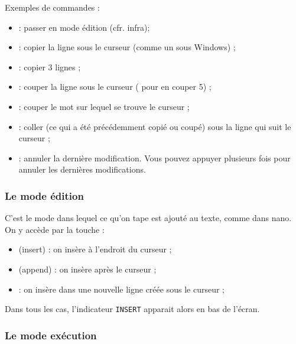\documentclass[a4paper,11pt]{style-esi/td}
\begin{document}
			Exemples de commandes :
			\begin{itemize}
			\item {} : passer en mode édition (cfr. infra);
			\item {} : copier la ligne sous le curseur (comme un  sous Windows) ; 
			\item {}	: copier 3 lignes ;
			\item {} : couper la ligne sous le curseur ( pour en couper 5) ;
			\item {} : couper le mot sur lequel se trouve le curseur ;
			\item {} : coller (ce qui a été précédemment copié ou coupé)
				sous la ligne qui suit le curseur ;
			\item {} : annuler la dernière modification. 
				Vous pouvez appuyer plusieurs fois pour annuler les dernières modifications.	
			\end{itemize}

			\subsubsection*{Le mode édition}
		
				C'est le mode dans lequel ce qu'on tape est ajouté au texte,
				comme dans nano.
				On y accède par la touche :
				\begin{itemize}
				\item {} (insert) : on insère à l'endroit du curseur ;
				\item {} (append) : on insère après le curseur ;
				\item {} : on insère dans une nouvelle ligne créée sous le curseur ;
				\end{itemize}

				Dans tous les cas, l'indicateur \texttt{INSERT} 
				apparait alors en bas de l'écran.

			\subsubsection*{Le mode exécution}
			
\end{document}
